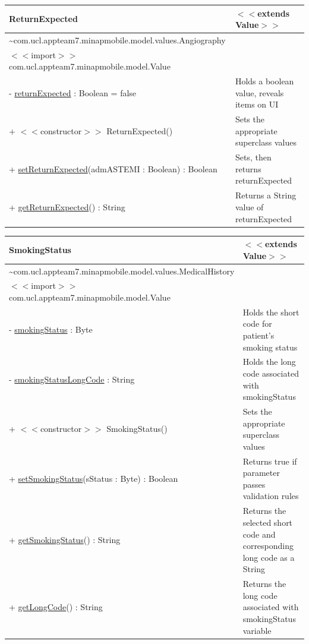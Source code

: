 \documentclass[12pt,a4paper,oneside,titlepage]{article}
\begin{document}
\begin{center}
	\begin{tabular}{| p{13cm} | p{5cm} |}
	\hline
	\textbf{ReturnExpected} & \textbf{$<<$extends Value$>>$} \\ \hline
	\textasciitilde com.ucl.appteam7.minapmobile.model.values.Angiography	 &  \\ \hline
$<<$import$>>$ com.ucl.appteam7.minapmobile.model.Value	  & \\ \hline \hline
- \underline{returnExpected} : Boolean = false	 & Holds a boolean value, reveals items on UI \\ \hline \hline
+ $<<$constructor$>>$ ReturnExpected() & 	Sets the appropriate superclass values \\ \hline
+ \underline{setReturnExpected}(admASTEMI : Boolean) : Boolean	 & Sets, then returns returnExpected \\ \hline
+ \underline{getReturnExpected}() : String & 	Returns a String value of returnExpected \\ \hline
	\end{tabular}
\end{center}


\begin{center}
	\begin{tabular}{| p{13cm} | p{5cm} |}
	\hline
	\textbf{SmokingStatus} & \textbf{$<<$extends Value$>>$} \\ \hline
	\textasciitilde com.ucl.appteam7.minapmobile.model.values.MedicalHistory	 &  \\ \hline
$<<$import$>>$ com.ucl.appteam7.minapmobile.model.Value	  & \\ \hline \hline
- \underline{smokingStatus} : Byte	 & Holds the short code for patient's smoking status \\ \hline
- \underline{smokingStatusLongCode} : String	 & Holds the long code associated with smokingStatus \\ \hline \hline
+ $<<$constructor$>>$ SmokingStatus()	 & Sets the appropriate superclass values \\ \hline
+ \underline{setSmokingStatus}(sStatus : Byte) : Boolean	 & Returns true if parameter passes validation rules \\ \hline
+ \underline{getSmokingStatus}() : String	 & Returns the selected short code and corresponding long code as a String \\ \hline
+ \underline{getLongCode}() : String	 & Returns the long code associated with smokingStatus variable \\ \hline
	\end{tabular}
\end{center}
\end{document}

